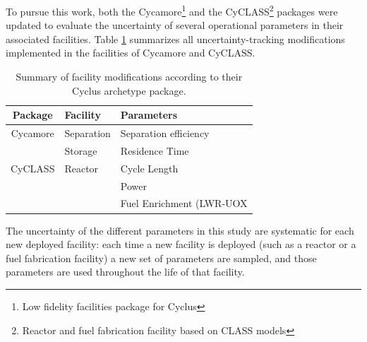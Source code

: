 \documentclass{anstrans}
\begin{document}
To pursue this work, both the Cycamore\footnote{Low
fidelity facilities package for Cyclus}\cite{cycamore} and the
CyCLASS\footnote{Reactor and fuel fabrication facility based on CLASS\cite{CLASS} models}\cite{mouginot_2018, cyclass} packages were
updated to evaluate the uncertainty of several
operational parameters in their associated facilities.  Table
\ref{tab:package_uncertainty} summarizes all uncertainty-tracking modifications implemented in the
facilities of Cycamore and CyCLASS.

\begin{table}[htb]
\centering
  \caption{Summary of facility modifications according to their Cyclus archetype package.}
\begin{tabular}{cl|l}
\toprule

Package   & Facility   & Parameters                \\
\toprule

Cycamore & Separation & Separation efficiency     \\\cmidrule{2-3} 
         & Storage    & Residence Time            \\
\toprule
CyCLASS  & Reactor    & Cycle Length              \\\cmidrule{3-3}
         &            & Power                     \\\cmidrule{3-3}
         &            & Fuel Enrichment (\gls{LWR}-\gls{UOX} \\

\bottomrule
\end{tabular}

  \label{tab:package_uncertainty}
\end{table}

The uncertainty of the different parameters in this study
are systematic for each new deployed facility: each time a new facility is
deployed (such as a reactor or a fuel fabrication facility) a new set of
parameters are sampled, and those parameters are used throughout the life
of that facility.
\end{document}
